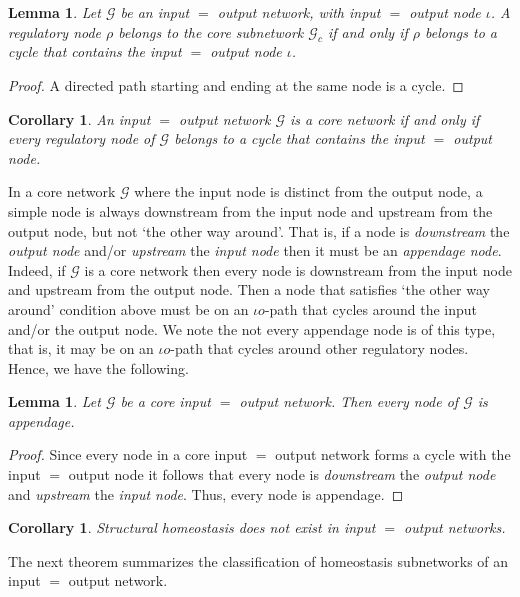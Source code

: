 \documentclass[pdflatex,sn-basic,Numbered]{sn-jnl}
\theoremstyle{thmstyleone}%
\newtheorem{lemma}[theorem]{Lemma}
\newtheorem{corollary}[theorem]{Corollary}
\numberwithin{equation}{section}
\begin{document}
\begin{lemma}
Let $\mathcal{G}$ be an input $=$ output network, with input $=$ output node $\iota$.
A regulatory node $\rho$ belongs to the core subnetwork $\mathcal{G}_c$ if and only if $\rho$ belongs to a cycle that contains the input $=$ output node $\iota$.
\end{lemma}
\begin{proof}
A directed path starting and ending at the same node is a cycle.
\end{proof}

\begin{corollary}
An input $=$ output network $\mathcal{G}$ is a core network if and only if every regulatory node of $\mathcal{G}$ belongs to a cycle that contains the input $=$ output node.
\end{corollary}

In a core network $\mathcal{G}$ where the input node is distinct from the output node, a simple node is always downstream from the input node and upstream from the output node, but not `the other way around'. 
That is, if a node is \emph{downstream} the \emph{output node} and/or \emph{upstream} the \emph{input node} then it must be an \emph{appendage node}. 
Indeed, if $\mathcal{G}$ is a core network then every node is downstream from the input node and upstream from the output node. 
Then a node that satisfies `the other way around' condition above must be on an $\iota o$-path that cycles around the input and/or the output node. 
We note the not every appendage node is of this type, that is, it may be on an $\iota o$-path that cycles around other regulatory nodes.
Hence, we have the following.

\begin{lemma} \label{THM:APPENDAGE}
Let $\mathcal{G}$ be a core input $=$ output network.
Then every node of $\mathcal{G}$ is appendage.
\end{lemma}
\begin{proof}
Since every node in a core input $=$ output network forms a cycle with the input $=$ output node it follows that every node is \emph{downstream} the \emph{output node} and \emph{upstream} the \emph{input node}.
Thus, every node is appendage.
\end{proof}

\begin{corollary}
Structural homeostasis does not exist in input $=$ output networks.
\end{corollary}

The next theorem summarizes the classification of homeostasis subnetworks of an input $=$ output network.
\end{document}
